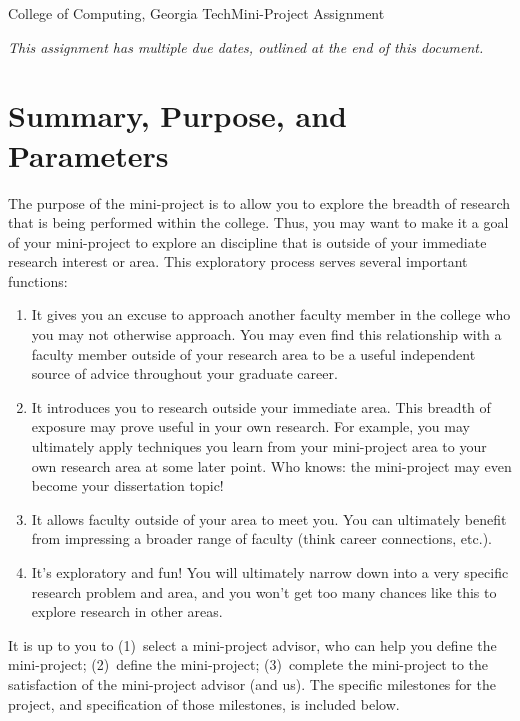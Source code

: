 \documentclass[11pt]{article}
\begin{document}


{College of Computing, Georgia Tech}{Mini-Project Assignment}

{\em This assignment has multiple due dates, outlined at the end of this
  document.}

\section{Summary, Purpose, and Parameters}

The purpose of the mini-project is to allow you to explore the breadth
of research that is being performed within the college.  Thus, you may
want to make it a goal of your mini-project to explore an discipline
that is outside of your immediate research interest or area.  This
exploratory process serves several important functions:

\begin{enumerate}
\item It gives you an excuse to approach another faculty member in the
  college who you may not otherwise approach.  You may even find this
  relationship with a faculty member outside of your research area to be
  a useful independent source of advice throughout your graduate career.
\item It introduces you to research outside your immediate area.  This
  breadth of exposure may prove useful in your own research.  For
  example, you may ultimately apply techniques you learn from your
  mini-project area to your own research area at some later point.  Who
  knows: the mini-project may even become your dissertation topic!
\item It allows faculty outside of your area to meet you. You can
  ultimately benefit from impressing a broader range of faculty (think
  career connections, etc.).
\item It's exploratory and fun!  You will ultimately narrow down into a
  very specific research problem and area, and you won't get too many
  chances like this to explore research in other areas.
\end{enumerate}

It is up to you to (1)~select a mini-project advisor, who can help you
define the mini-project; (2)~define the mini-project; (3)~complete the
mini-project to the satisfaction of the mini-project advisor (and us).
The specific milestones for the project, and specification of those
milestones, is included below.
\end{document}
